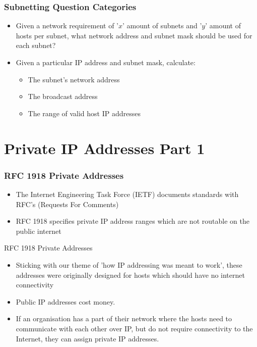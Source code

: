 \documentclass[pdflatex,compress]{beamer}
\begin{document}
\begin{frame}
	\frametitle{Subnetting Question Categories}
	\begin{itemize}
		\item Given a network requirement of '$ x $' amount of subnets and '$ y $' amount of hosts per subnet, what network address and subnet mask should be used for each subnet?
		\item Given a particular IP address and subnet mask, calculate:
		\begin{itemize}
			\item The subnet’s network address
			\item The broadcast address
			\item The range of valid host IP addresses
		\end{itemize}
	\end{itemize}
\end{frame}

\section{Private IP Addresses Part 1}

\begin{frame}
	\frametitle{RFC 1918 Private Addresses}
	\begin{itemize}
		\item The Internet Engineering Task Force (IETF) documents standards with RFC’s (Requests For Comments)
		\item RFC 1918 specifies private IP address ranges which are not routable on the public internet
	\end{itemize}
\end{frame}

\begin{frame}{RFC 1918 Private Addresses}
	\begin{itemize}
		\item Sticking with our theme of 'how IP addressing was meant to work', these addresses were originally designed for hosts which should have no internet connectivity
		\item Public IP addresses cost money.
		\item If an organisation has a part of their network where the hosts need to communicate with each other over IP, but do not require connectivity to the Internet, they can assign private IP addresses.
	\end{itemize}
\end{frame}
\end{document}
